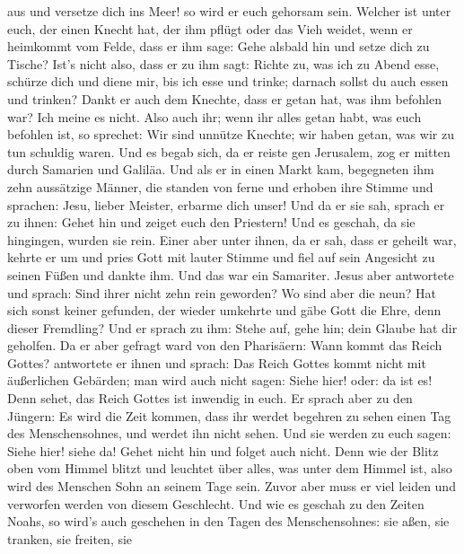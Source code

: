 aus und versetze dich ins Meer! so wird er euch gehorsam sein.
 Welcher ist unter euch, der einen Knecht hat, der ihm
pflügt oder das Vieh weidet, wenn er heimkommt vom Felde, dass er ihm
sage: Gehe alsbald hin und setze dich zu Tische?  Ist's
nicht also, dass er zu ihm sagt: Richte zu, was ich zu Abend esse,
schürze dich und diene mir, bis ich esse und trinke; darnach sollst du
auch essen und trinken?  Dankt er auch dem Knechte, dass er
getan hat, was ihm befohlen war? Ich meine es nicht.  Also
auch ihr; wenn ihr alles getan habt, was euch befohlen ist, so sprechet:
Wir sind unnütze Knechte; wir haben getan, was wir zu tun schuldig
waren.  Und es begab sich, da er reiste gen Jerusalem, zog
er mitten durch Samarien und Galiläa.  Und als er in einen
Markt kam, begegneten ihm zehn aussätzige Männer, die standen von ferne
 und erhoben ihre Stimme und sprachen: Jesu, lieber
Meister, erbarme dich unser!  Und da er sie sah, sprach er
zu ihnen: Gehet hin und zeiget euch den Priestern! Und es geschah, da
sie hingingen, wurden sie rein.  Einer aber unter ihnen, da
er sah, dass er geheilt war, kehrte er um und pries Gott mit lauter
Stimme  und fiel auf sein Angesicht zu seinen Füßen und
dankte ihm. Und das war ein Samariter.  Jesus aber
antwortete und sprach: Sind ihrer nicht zehn rein geworden? Wo sind aber
die neun?  Hat sich sonst keiner gefunden, der wieder
umkehrte und gäbe Gott die Ehre, denn dieser Fremdling? 
Und er sprach zu ihm: Stehe auf, gehe hin; dein Glaube hat dir geholfen.
 Da er aber gefragt ward von den Pharisäern: Wann kommt das
Reich Gottes? antwortete er ihnen und sprach: Das Reich Gottes kommt
nicht mit äußerlichen Gebärden;  man wird auch nicht sagen:
Siehe hier! oder: da ist es! Denn sehet, das Reich Gottes ist inwendig
in euch.  Er sprach aber zu den Jüngern: Es wird die Zeit
kommen, dass ihr werdet begehren zu sehen einen Tag des Menschensohnes,
und werdet ihn nicht sehen.  Und sie werden zu euch sagen:
Siehe hier! siehe da! Gehet nicht hin und folget auch nicht.
 Denn wie der Blitz oben vom Himmel blitzt und leuchtet
über alles, was unter dem Himmel ist, also wird des Menschen Sohn an
seinem Tage sein.  Zuvor aber muss er viel leiden und
verworfen werden von diesem Geschlecht.  Und wie es geschah
zu den Zeiten Noahs, so wird's auch geschehen in den Tagen des
Menschensohnes:  sie aßen, sie tranken, sie freiten, sie
